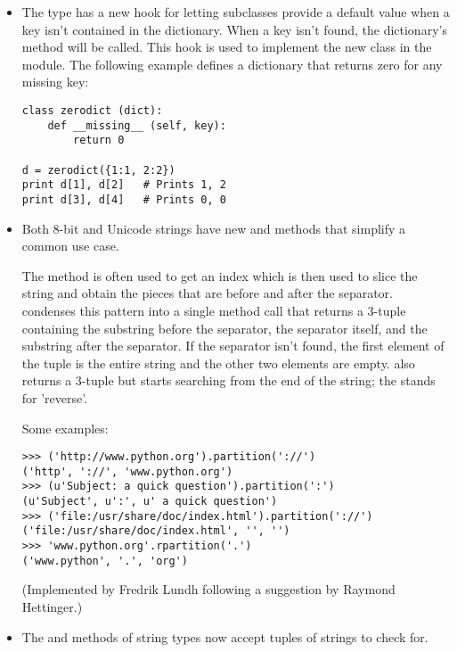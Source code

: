\documentclass{howto}
\begin{document}
\begin{itemize}

\item The  type has a new hook for letting subclasses
provide a default value when a key isn't contained in the dictionary.
When a key isn't found, the dictionary's
method will be called.  This hook is used to implement
the new  class in the 
module.  The following example defines a dictionary 
that returns zero for any missing key:

\begin{verbatim}
class zerodict (dict):
    def __missing__ (self, key):
        return 0

d = zerodict({1:1, 2:2})
print d[1], d[2]   # Prints 1, 2
print d[3], d[4]   # Prints 0, 0
\end{verbatim}

\item Both 8-bit and Unicode strings have new  
and  methods that simplify a common use case.

The  method is often used to get an index which is
then used to slice the string and obtain the pieces that are before
and after the separator.  
 condenses this
pattern into a single method call that returns a 3-tuple containing
the substring before the separator, the separator itself, and the
substring after the separator.  If the separator isn't found, the
first element of the tuple is the entire string and the other two
elements are empty.   also returns a 3-tuple
but starts searching from the end of the string; the  stands
for 'reverse'.

Some examples:

\begin{verbatim}
>>> ('http://www.python.org').partition('://')
('http', '://', 'www.python.org')
>>> (u'Subject: a quick question').partition(':')
(u'Subject', u':', u' a quick question')
>>> ('file:/usr/share/doc/index.html').partition('://')
('file:/usr/share/doc/index.html', '', '')
>>> 'www.python.org'.rpartition('.')
('www.python', '.', 'org')
\end{verbatim}

(Implemented by Fredrik Lundh following a suggestion by Raymond Hettinger.)

\item The  and  methods
of string types now accept tuples of strings to check for.


\end{itemize}
\end{document}
